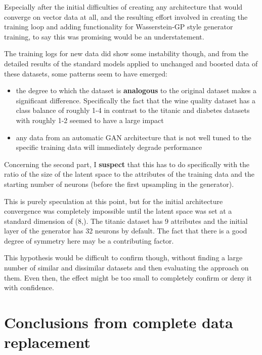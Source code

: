 Especially after the initial difficulties of creating any architecture that would converge on vector data at all, and the resulting effort involved in creating the training loop and adding functionality for Wasserstein-GP style generator training, to say this was promising would be an understatement.

The training logs for new data did show some instability though, and from the detailed results of the standard models applied to unchanged and boosted data of these datasets, some patterns seem to have emerged:

\begin{itemize}
	\item the degree to which the dataset is \textbf{analogous} to the original dataset makes a significant difference. Specifically the fact that the wine quality dataset has a class balance of roughly 1-4 in contrast to the titanic and diabetes datasets with roughly 1-2 seemed to have a large impact
	\item any data from an automatic \ac{GAN} architecture that is not well tuned to the specific training data will immediately degrade performance
\end{itemize} 

Concerning the second part, I \textbf{suspect} that this has to do specifically with the ratio of the size of the latent space to the attributes of the training data and the starting number of neurons (before the first upsampling in the generator).

This is purely speculation at this point, but for the initial architecture convergence was completely impossible until the latent space was set at a standard dimension of (8,). The titanic dataset has 9 attributes and the initial layer of the generator has 32 neurons by default. The fact that there is a good degree of symmetry here may be a contributing factor.

\label{note:hypothesis}

This hypothesis would be difficult to confirm though, without finding a large number of similar and dissimilar datasets and then evaluating the approach on them. Even then, the effect might be too small to completely confirm or deny it with confidence.

\pagebreak

\section{Conclusions from complete data replacement}

